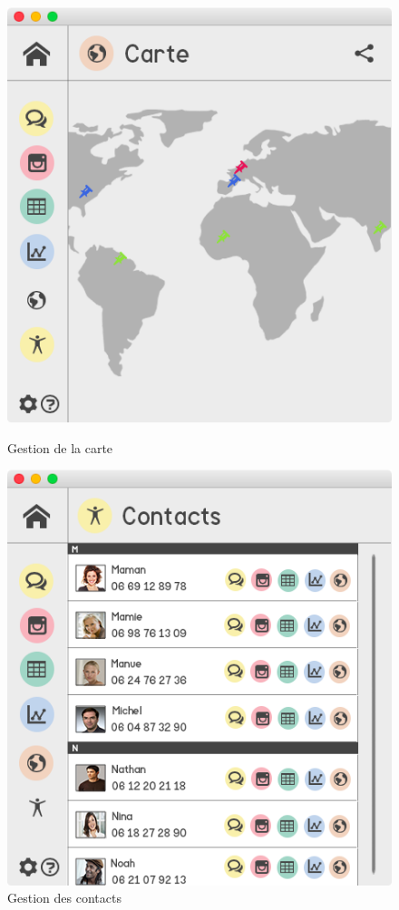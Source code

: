 \documentclass[11pt]{article}
\begin{document}
\begin{figure}[hbtp]
    \begin{minipage}[b]{0.4\linewidth}
        \centering \includegraphics[scale=0.43]{Modelisation/carte.png}
        \caption{Gestion de la carte}
                \label{fig:carte}
\label{fig:base}
    \end{minipage}\hfill
    \begin{minipage}[b]{0.48\linewidth}
        \centering \includegraphics[scale=0.43]{Modelisation/contact.png}
        \caption{Gestion des contacts}
         \label{fig:contact}
    \end{minipage}
\end{figure}

\newpage
\listoffigures
\end{document}
